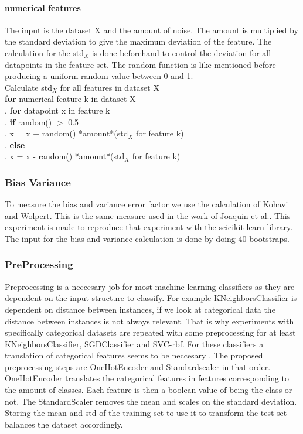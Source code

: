 \documentclass[a4paper,10pt]{article}
\begin{document}
\paragraph{numerical features \newline}
The input is the dataset X and the amount of noise. The amount is multiplied by the standard deviation to give the maximum deviation of the feature. The calculation for the std$_X$ is done beforehand to control the deviation for all datapoints in the feature set. The random function is like mentioned before producing a uniform random value between 0 and 1.\\
Calculate std$_X$ for all features in dataset X\\
\textbf{for} numerical feature k in dataset X\\
.\hspace{1cm} \textbf{for} datapoint x in feature k\\
.\hspace{2cm} \textbf{if} random() $>$ 0.5 \\	
.\hspace{3cm} x = x + random() *amount*(std$_X$ for feature k)\\
.\hspace{2cm} \textbf{else}  \\	
.\hspace{3cm} x = x - random() *amount*(std$_X$ for feature k) 
\\

\subsubsection{Bias Variance}
To measure the bias and variance error factor we use the calculation of Kohavi and Wolpert\cite{BiasCalc}. This is the same measure used in the work of Joaquin et al.\cite{Bias-var}. This experiment is made to reproduce that experiment with the scicikit-learn library. The input for the bias and variance calculation is done by doing 40 bootstraps. 

\subsubsection{PreProcessing}
Preprocessing is a neccesary job for most machine learning classifiers as they are dependent on the input structure to classify. For example KNeighborsClassifier is dependent on distance between instances, if we look at categorical data the distance between instances is not always relevant. That is why experiments with specifically categorical datasets are repeated with some preprocessing for at least KNeighborsClassifier, SGDClassifier and SVC-rbf. For these classifiers a translation of categorical features seems to be neccesary \cite{KNN-Sym}\cite{SVM-sym}. The proposed preprocessing steps are OneHotEncoder and Standardscaler in that order. OneHotEncoder translates the categorical features in features corresponding to the amount of classes. Each feature is then a boolean value of being the class or not. The StandardScaler removes the mean and scales on the standard deviation. Storing the mean and std of the training set to use it to transform the test set balances the dataset accordingly. 
\newpage
\end{document}

